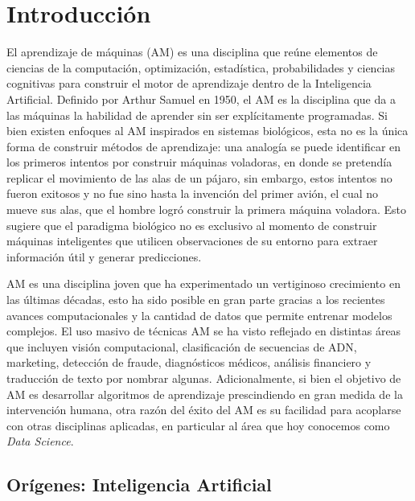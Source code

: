 

\section{Introducción}


El aprendizaje de máquinas (AM) es una disciplina que reúne elementos de ciencias de la computación, optimización, estadística, probabilidades y ciencias cognitivas para construir el motor de aprendizaje dentro de la Inteligencia Artificial. Definido por Arthur Samuel en 1950, el AM es la disciplina que da a las máquinas la habilidad de aprender sin ser explícitamente programadas. Si bien existen enfoques al AM inspirados en sistemas biológicos, esta no es la única forma de construir métodos de aprendizaje: una analogía se puede identificar en los primeros intentos por construir máquinas voladoras, en donde se pretendía replicar el movimiento de las alas de un pájaro, sin embargo, estos intentos no fueron exitosos y no fue sino hasta la invención del primer avión, el cual no mueve sus alas, que el hombre logró construir la primera máquina voladora. Esto sugiere que el paradigma biológico no es exclusivo al momento de construir máquinas inteligentes que utilicen observaciones de su entorno para extraer información útil y generar predicciones. 


AM es una disciplina joven que ha experimentado un vertiginoso crecimiento en las últimas décadas, esto ha sido posible en gran parte gracias a los recientes avances computacionales y la cantidad de datos que permite entrenar modelos complejos. El uso masivo de técnicas AM se ha visto reflejado en distintas áreas que incluyen visión computacional, clasificación de secuencias de ADN, marketing, detección de fraude, diagnósticos médicos, análisis financiero y traducción de texto por nombrar algunas. Adicionalmente, si bien el objetivo de AM es desarrollar algoritmos de aprendizaje prescindiendo en gran medida de la intervención humana,  otra razón del éxito del AM es su facilidad para acoplarse con otras disciplinas aplicadas, en particular al área que hoy conocemos como \textit{Data Science}. 

\subsection{Orígenes: Inteligencia Artificial}

